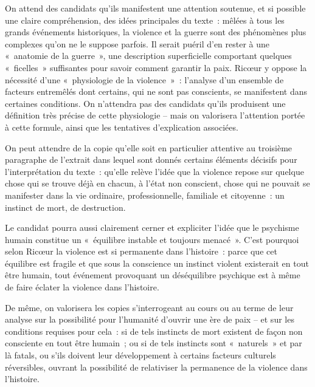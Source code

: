 {On attend des candidats qu'ils manifestent une attention soutenue, et si
possible une claire compréhension, des idées principales du texte~: mêlées à tous les
grands événements historiques, la violence et la guerre sont des phénomènes plus
complexes qu'on ne le suppose parfois. Il serait puéril d'en rester à une «~anatomie de
la guerre~», une description superficielle comportant quelques «~ficelles~» suffisantes
pour savoir comment garantir la paix. Ricœur y oppose la nécessité d'une
«~physiologie de la violence~»~: l'analyse d'un ensemble de facteurs entremêlés dont
certains, qui ne sont pas conscients, se manifestent dans certaines conditions. On
n'attendra pas des candidats qu'ils produisent une définition très précise de cette
physiologie – mais on valorisera l'attention portée à cette formule, ainsi que les
tentatives d'explication associées.

On peut attendre de la copie qu'elle soit en particulier attentive au troisième
paragraphe de l'extrait dans lequel sont donnés certains éléments décisifs pour
l'interprétation du texte~: qu'elle relève l'idée que la violence repose sur quelque chose
qui se trouve déjà en chacun, à l'état non conscient, chose qui ne pouvait se manifester
dans la vie ordinaire, professionnelle, familiale et citoyenne~: un instinct de mort, de
destruction.

Le candidat pourra aussi clairement cerner et expliciter l'idée que le psychisme
humain constitue un «~équilibre instable et toujours menacé~». C'est pourquoi selon Ricœur la violence est si permanente dans l'histoire~: parce que cet équilibre est fragile
et que sous la conscience un instinct violent existerait en tout être humain, tout
événement provoquant un déséquilibre psychique est à même de faire éclater la
violence dans l'histoire.

De même, on valorisera les copies s'interrogeant au cours ou au terme de leur
analyse sur la possibilité pour l'humanité d'ouvrir une ère de paix – et sur les conditions
requises pour cela~: si de tels instincts de mort existent de façon non consciente en
tout être humain~; ou si de tels instincts sont «~naturels~» et par là fatals, ou s'ils doivent
leur développement à certains facteurs culturels réversibles, ouvrant la possibilité de
relativiser la permanence de la violence dans l'histoire.}%
